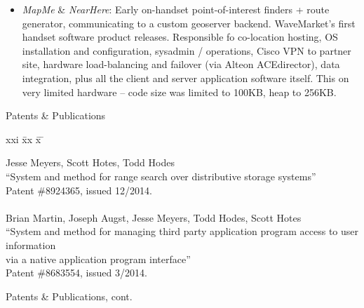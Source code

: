 \begin{itemize}
  		\item {\em MapMe} \& {\em NearHere}:
		Early on-handset point-of-interest finders + route generator, communicating to a custom geoserver
		backend. WaveMarket's first handset software product releases. Responsible fo co-location hosting,
		OS installation and configuration, sysadmin / operations, Cisco VPN to partner site, hardware load-balancing
		and failover (via Alteon ACEdirector), data integration, plus all the client and server application software itself.
		This on very limited hardware -- code size was limited to 100KB, heap to 256KB.
		
	\end{itemize}


\bigskip
\bigskip

\begin{bf} \large
Patents \& Publications
\end{bf}
\begin{tabbing}
xxi \= xx \= x \= \kill

\>    Jesse Meyers, Scott Hotes, Todd Hodes \\
\>\>      ``System and method for range search over distributive storage systems'' \\
\>\>    Patent \#8924365, issued 12/2014. \\

\smallskip \\[-3pt]
\>    Brian Martin, Joseph Augst, Jesse Meyers, Todd Hodes, Scott Hotes \\
\>\>      ``System and method for managing third party application program access to user information \\
\>\>      via a native application program interface'' \\
\>\>    Patent \#8683554, issued 3/2014. \\

\end{tabbing}
\newpage
\begin{bf} \large
Patents \& Publications, cont.
\end{bf}
